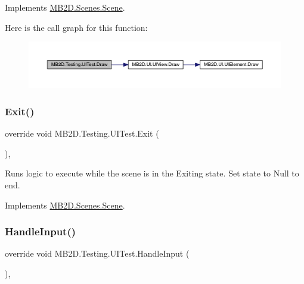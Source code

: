 Implements \hyperlink{class_m_b2_d_1_1_scenes_1_1_scene_a932d33071ecb4c5187367825dba72324}{M\+B2\+D.\+Scenes.\+Scene}.

Here is the call graph for this function\+:\nopagebreak
\begin{figure}[H]
\begin{center}
\leavevmode
\includegraphics[width=350pt]{class_m_b2_d_1_1_testing_1_1_u_i_test_a9656d2d62517288a7b4387dafe741ea0_cgraph}
\end{center}
\end{figure}
\hypertarget{class_m_b2_d_1_1_testing_1_1_u_i_test_ad7ad379db3fc9990e634b3edbd4b1a41}{}\label{class_m_b2_d_1_1_testing_1_1_u_i_test_ad7ad379db3fc9990e634b3edbd4b1a41} 
\subsubsection{\texorpdfstring{Exit()}{Exit()}}
{\footnotesize\ttfamily override void M\+B2\+D.\+Testing.\+U\+I\+Test.\+Exit (\begin{DoxyParamCaption}{ }\end{DoxyParamCaption})\hspace{0.3cm}{\ttfamily [inline]}, {\ttfamily [virtual]}}



Runs logic to execute while the scene is in the Exiting state. Set state to Null to end. 



Implements \hyperlink{class_m_b2_d_1_1_scenes_1_1_scene_a099b79e16d23b67349847999d2336813}{M\+B2\+D.\+Scenes.\+Scene}.

\hypertarget{class_m_b2_d_1_1_testing_1_1_u_i_test_abfdabac63f2f6dd07e49c181ce84b24d}{}\label{class_m_b2_d_1_1_testing_1_1_u_i_test_abfdabac63f2f6dd07e49c181ce84b24d} 
\subsubsection{\texorpdfstring{Handle\+Input()}{HandleInput()}}
{\footnotesize\ttfamily override void M\+B2\+D.\+Testing.\+U\+I\+Test.\+Handle\+Input (\begin{DoxyParamCaption}{ }\end{DoxyParamCaption})\hspace{0.3cm}{\ttfamily [inline]}, {\ttfamily [virtual]}}



